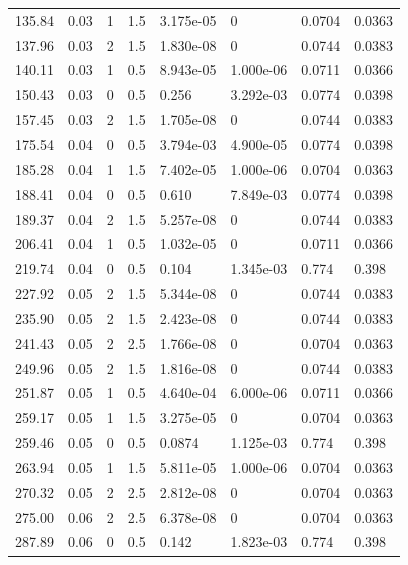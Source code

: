 \documentclass[preview]{standalone}
\begin{document}
{{\begin{tabular}{L{1.2cm}C{1.2cm} C{0.3cm}C{0.5cm} C{1.4cm}C{1.4cm} C{1.4cm}C{1.4cm}}
  135.84  &  0.03  & 1     & 1.5 &  3.175e-05  & 0  & 0.0704 &  0.0363   \\ 
  137.96  &  0.03  & 2     & 1.5 &  1.830e-08  & 0  & 0.0744 &  0.0383   \\ 
  140.11  &  0.03  & 1     & 0.5 &  8.943e-05  & 1.000e-06  & 0.0711 &  0.0366   \\ 
  150.43  &  0.03  & 0     & 0.5 &  0.256  & 3.292e-03  & 0.0774 &  0.0398   \\ 
  157.45  &  0.03  & 2     & 1.5 &  1.705e-08  & 0  & 0.0744 &  0.0383   \\ 
  175.54  &  0.04  & 0     & 0.5 &  3.794e-03  & 4.900e-05  & 0.0774 &  0.0398   \\ 
  185.28  &  0.04  & 1     & 1.5 &  7.402e-05  & 1.000e-06  & 0.0704 &  0.0363   \\ 
  188.41  &  0.04  & 0     & 0.5 &  0.610  & 7.849e-03  & 0.0774 &  0.0398   \\ 
  189.37  &  0.04  & 2     & 1.5 &  5.257e-08  & 0  & 0.0744 &  0.0383   \\ 
  206.41  &  0.04  & 1     & 0.5 &  1.032e-05  & 0  & 0.0711 &  0.0366   \\ 
  219.74  &  0.04  & 0     & 0.5 &  0.104  & 1.345e-03  & 0.774 &  0.398   \\ 
  227.92  &  0.05  & 2     & 1.5 &  5.344e-08  & 0  & 0.0744 &  0.0383   \\ 
  235.90  &  0.05  & 2     & 1.5 &  2.423e-08  & 0  & 0.0744 &  0.0383   \\ 
  241.43  &  0.05  & 2     & 2.5 &  1.766e-08  & 0  & 0.0704 &  0.0363   \\ 
  249.96  &  0.05  & 2     & 1.5 &  1.816e-08  & 0  & 0.0744 &  0.0383   \\ 
  251.87  &  0.05  & 1     & 0.5 &  4.640e-04  & 6.000e-06  & 0.0711 &  0.0366   \\ 
  259.17  &  0.05  & 1     & 1.5 &  3.275e-05  & 0  & 0.0704 &  0.0363   \\ 
  259.46  &  0.05  & 0     & 0.5 &  0.0874  & 1.125e-03  & 0.774 &  0.398   \\ 
  263.94  &  0.05  & 1     & 1.5 &  5.811e-05  & 1.000e-06  & 0.0704 &  0.0363   \\ 
  270.32  &  0.05  & 2     & 2.5 &  2.812e-08  & 0  & 0.0704 &  0.0363   \\ 
  275.00  &  0.06  & 2     & 2.5 &  6.378e-08  & 0  & 0.0704 &  0.0363   \\ 
  287.89  &  0.06  & 0     & 0.5 &  0.142  & 1.823e-03  & 0.774 &  0.398   \\ 

\end{tabular}}}
\end{document}
